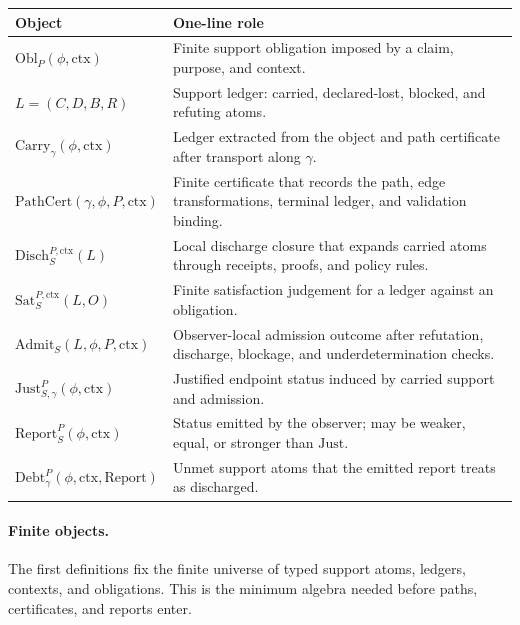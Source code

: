 \documentclass[11pt,twoside]{article}
\newcommand{\OGTableFont}{\small}
\newcommand{\OGTableHeaderRow}{\rowcolor{tableheaderbg}}
\newcommand{\TableHeaderRow}{\OGTableHeaderRow}
\newenvironment{OGInlineTable}[1]{%
  \par\smallskip
  \begin{center}
  #1
  \renewcommand{\arraystretch}{1.08}%
  \captionsetup{type=table,hypcap=false}%
  \rowcolors{2}{tablerowbg}{white}%
}{%
  \rowcolors{2}{}{}%
  \end{center}%
  \smallskip
}
\theoremstyle{definition}
\newcommand{\Obl}{\mathrm{Obl}}
\newcommand{\Carry}{\mathrm{Carry}}
\newcommand{\Debt}{\mathrm{Debt}}
\newcommand{\PathCert}{\mathrm{PathCert}}
\newcommand{\Sat}{\mathrm{Sat}}
\newcommand{\Admit}{\mathrm{Admit}}
\newcommand{\Disch}{\mathrm{Disch}}
\newcommand{\Just}{\mathrm{Just}}
\newcommand{\Report}{\mathrm{Report}}
\newcommand{\ctx}{\mathrm{ctx}}
\begin{document}
\begin{OGInlineTable}{\OGTableFont}
\begin{tabularx}{\textwidth}{>{\raggedright\arraybackslash}p{}>{\raggedright\arraybackslash}X}
\toprule
\TableHeaderRow \textbf{Object} & \textbf{One-line role} \\
\midrule
$\Obl_P(\phi,\ctx)$ & Finite support obligation imposed by a claim, purpose, and context. \\
$L=(C,D,B,R)$ & Support ledger: carried, declared-lost, blocked, and refuting atoms. \\
$\Carry_\gamma(\phi,\ctx)$ & Ledger extracted from the object and path certificate after transport along $\gamma$. \\
$\PathCert(\gamma,\phi,P,\ctx)$ & Finite certificate that records the path, edge transformations, terminal ledger, and validation binding. \\
$\Disch_S^{P,\ctx}(L)$ & Local discharge closure that expands carried atoms through receipts, proofs, and policy rules. \\
$\Sat_S^{P,\ctx}(L,O)$ & Finite satisfaction judgement for a ledger against an obligation. \\
$\Admit_S(L,\phi,P,\ctx)$ & Observer-local admission outcome after refutation, discharge, blockage, and underdetermination checks. \\
$\Just_{S,\gamma}^P(\phi,\ctx)$ & Justified endpoint status induced by carried support and admission. \\
$\Report_S^P(\phi,\ctx)$ & Status emitted by the observer; may be weaker, equal, or stronger than $\Just$. \\
$\Debt_\gamma^P(\phi,\ctx,\Report)$ & Unmet support atoms that the emitted report treats as discharged. \\
\bottomrule
\end{tabularx}
\caption{Core calculus quick reference. This is the minimum object set used by the theorem spine.}
\label{tab:core-calculus-reference}
\end{OGInlineTable}

\paragraph{Finite objects.}
The first definitions fix the finite universe of typed support atoms, ledgers,
contexts, and obligations. This is the minimum algebra needed before paths,
certificates, and reports enter.
\end{document}
